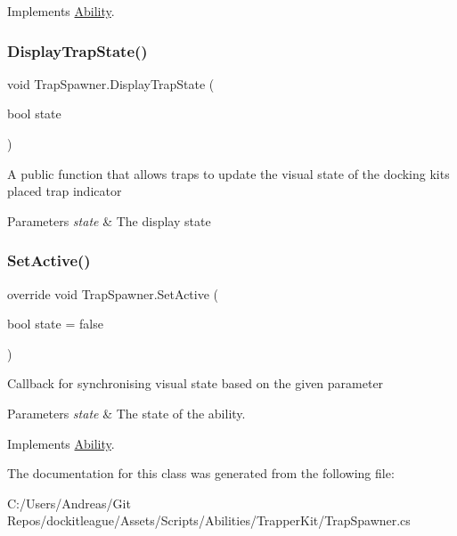 Implements \hyperlink{class_ability_a7722265862f8b29828315725415ce266}{Ability}.

\hypertarget{class_trap_spawner_a3ea9d0db92caae6b1a70903fbdfda3cf}{}\label{class_trap_spawner_a3ea9d0db92caae6b1a70903fbdfda3cf} 
\subsubsection{\texorpdfstring{Display\+Trap\+State()}{DisplayTrapState()}}
{\footnotesize\ttfamily void Trap\+Spawner.\+Display\+Trap\+State (\begin{DoxyParamCaption}\item[{bool}]{state }\end{DoxyParamCaption})}



A public function that allows traps to update the visual state of the docking kit\textquotesingle{}s placed trap indicator 


\begin{DoxyParams}{Parameters}
{\em state} & The display state\\
\hline
\end{DoxyParams}
\hypertarget{class_trap_spawner_af9de8164ae685cef7e8f4349384f5e45}{}\label{class_trap_spawner_af9de8164ae685cef7e8f4349384f5e45} 
\subsubsection{\texorpdfstring{Set\+Active()}{SetActive()}}
{\footnotesize\ttfamily override void Trap\+Spawner.\+Set\+Active (\begin{DoxyParamCaption}\item[{bool}]{state = {\ttfamily false} }\end{DoxyParamCaption})\hspace{0.3cm}{\ttfamily [virtual]}}



Callback for synchronising visual state based on the given parameter 


\begin{DoxyParams}{Parameters}
{\em state} & The state of the ability.\\
\hline
\end{DoxyParams}


Implements \hyperlink{class_ability_a10f7f3c2b63eeef6e352aee48d246384}{Ability}.



The documentation for this class was generated from the following file\+:\begin{DoxyCompactItemize}
\item 
C\+:/\+Users/\+Andreas/\+Git Repos/dockitleague/\+Assets/\+Scripts/\+Abilities/\+Trapper\+Kit/Trap\+Spawner.\+cs\end{DoxyCompactItemize}
